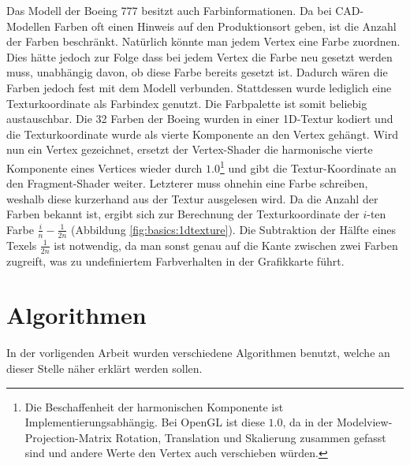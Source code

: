 Das Modell der Boeing 777 besitzt auch Farbinformationen. Da bei CAD-Modellen Farben oft einen Hinweis auf den Produktionsort geben, ist die Anzahl der Farben beschränkt. Natürlich könnte man jedem Vertex eine Farbe zuordnen. Dies hätte jedoch zur Folge dass bei jedem Vertex die Farbe neu gesetzt werden muss, unabhängig davon, ob diese Farbe bereits gesetzt ist. Dadurch wären die Farben jedoch fest mit dem Modell verbunden. Stattdessen wurde lediglich eine Texturkoordinate als Farbindex genutzt. Die Farbpalette ist somit beliebig austauschbar. Die 32 Farben der Boeing wurden in einer 1D-Textur kodiert und die Texturkoordinate wurde als vierte Komponente an den Vertex gehängt. Wird nun ein Vertex gezeichnet, ersetzt der Vertex-Shader die harmonische vierte Komponente eines Vertices wieder durch $1.0$\footnote{Die Beschaffenheit der harmonischen Komponente ist Implementierungsabhängig. Bei OpenGL ist diese $1.0$, da in der Modelview-Projection-Matrix Rotation, Translation und Skalierung zusammen gefasst sind und andere Werte den Vertex auch verschieben würden.} und gibt die Textur-Koordinate an den Fragment-Shader weiter. Letzterer muss ohnehin eine Farbe schreiben, weshalb diese kurzerhand aus der Textur ausgelesen wird. Da die Anzahl der Farben bekannt ist, ergibt sich zur Berechnung der Texturkoordinate der $i$-ten Farbe $\frac{i}{n}-\frac{1}{2n}$ (Abbildung \ref{fig:basics:1dtexture}). Die Subtraktion der Hälfte eines Texels $\frac{1}{2n}$ ist notwendig, da man sonst genau auf die Kante zwischen zwei Farben zugreift, was zu undefiniertem Farbverhalten in der Grafikkarte führt.

\section{Algorithmen}
\label{sec:basics:algos}
In der vorligenden Arbeit wurden verschiedene Algorithmen benutzt, welche an dieser Stelle näher erklärt werden sollen.

